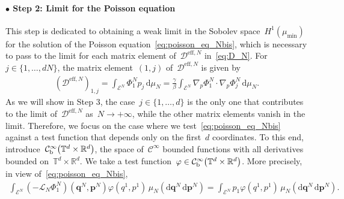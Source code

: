 \documentclass[onefignum,onetabnum]{siamart251216} %
\renewcommand{\d}{\mathrm{d}}
\newcommand{\torus}{\mathbb T}
\newcommand{\real}{\mathbb R}
\newcommand{\mc}[1]{\mathcal{#1}}
\newcommand{\mescin}{\mu}
\newcommand{\DeffN}{\mc{D}^{\mathrm{eff},N}}
\newcommand{\vq}[1]{q^{#1}}
\newcommand{\vp}[1]{p^{#1}}
\newcommand{\vP}[1]{\mathbf{p}^{#1}}
\newcommand{\vQ}[1]{\mathbf{q}^{#1}}
\theoremstyle{plain}
\numberwithin{equation}{section}
\numberwithin{theorem}{section}
\newcounter{ucounter}
\newcommand{\uv}[1]{
  \stepcounter{ucounter}
  \textcolor{orange}{
      \\[.2cm]
    U, comment \arabic{ucounter}. #1
    \\[.2cm]
  }
}
\renewcommand{\uv}[1]{\textcolor{orange}{#1}}
\begin{document}
\paragraph{$\bullet$ Step 2: Limit for the Poisson equation}
This step is dedicated to obtaining a weak limit in the Sobolev space~$H^1(\mescin_{\min})$ for the solution of the Poisson equation~\eqref{eq:poisson_eq_Nbis}, which is necessary to pass to the limit for each matrix element of~$\DeffN$ in~\eqref{eq:D_N}. For~$j\in\{1,\dots,dN\}$, the matrix element~$(1,j)$ of~$\DeffN$ is given by
\begin{align*}
    (\DeffN)_{1,j} = \int_{\mc{E}^N} \Phi_1^N p_j \, \d\mescin_N = \frac{\gamma}{\beta}\int_{\mc{E}^N} \nabla_p \Phi_1^N \cdot \nabla_p \Phi_j^N \, \d\mescin_N.
\end{align*}
As we will show in Step 3, the case~$j \in \{1,\dots,d\}$ is the only one that contributes to the limit of~$\DeffN$ as~$N \rightarrow +\infty$, while the other matrix elements vanish in the limit. Therefore, we focus on the case where we test~\eqref{eq:poisson_eq_Nbis} against a test function that depends only on the first~$d$ coordinates.
To this end, introduce~$\mc{C}_{\rm b}^\infty\!\left(\torus^d \times \real^d\right)$, the space of~$\mc{C}^\infty$ bounded functions with all derivatives bounded on~$\torus^d \times \real^d$. We take a test function~$\varphi\in\mc{C}_{\rm b}^\infty\!\left(\torus^d \times \real^d\right)$.
More precisely, in view of~\eqref{eq:poisson_eq_Nbis},
\begin{align}
    \label{eq:Poisson_integral}
    \int_{\mc{E}^{N}}(-\mathcal{L}_N \Phi_1^N) (\vQ{N},\vP{N}) \varphi(\vq{1},\vp{1})\, \mescin_N(\d\vQ{N}\,\d\vP{N}) = \int_{\mc{E}^{N}} p_1 \varphi(\vq{1},\vp{1}) \, \mescin_N(\d\vQ{N}\,\d\vP{N}).
\end{align}
\end{document}
